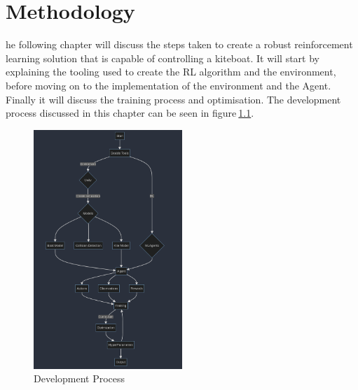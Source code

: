 
%
\let\textcircled=\pgftextcircled\chapter{Methodology}

he following chapter will discuss the steps taken to create a robust reinforcement learning solution that is capable of controlling a kiteboat. It will start by explaining the tooling used to create the RL algorithm and the environment, before moving on to the implementation of the environment and the Agent. Finally it will discuss the training process and optimisation. The development process discussed in this chapter can be seen in figure$~$\ref{development_process}.

\begin{figure}[h]
    \centering
    \includegraphics[width=0.5\textwidth]{Images/method.png}
    \caption{Development Process}\label{development_process}
\end{figure}

